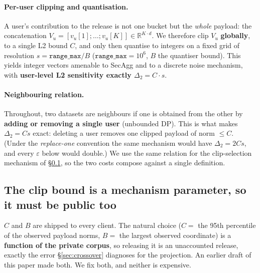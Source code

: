 \documentclass[pdflatex,sn-mathphys-num,iicol]{sn-jnl}
\theoremstyle{thmstyleone}%
\theoremstyle{thmstyletwo}%
\theoremstyle{thmstylethree}%
\newcommand{\eps}{\varepsilon}
\newcommand{\R}{\mathbb{R}}
\newcommand{\secref}[1]{\S\ref{#1}}
\begin{document}
\paragraph{Per-user clipping and quantisation.} A user's contribution to the
release is not one bucket but the \emph{whole} payload: the concatenation
$V_u = [v_u[1]; \dots; v_u[K]] \in \R^{K \cdot d}$. We therefore clip $V_u$
\textbf{globally}, to a single L2 bound $C$, and only then quantise to integers on
a fixed grid of resolution $s = \texttt{range\_max} / B$
($\texttt{range\_max} = 10^{6}$, $B$ the quantiser bound). This yields integer
vectors amenable to SecAgg and to a discrete noise mechanism, with
\textbf{user-level L2 sensitivity exactly $\Delta_2 = C \cdot s$}.

\paragraph{Neighbouring relation.} Throughout, two datasets are neighbours if one
is obtained from the other by \textbf{adding or removing a single user}
(unbounded DP). This is what makes $\Delta_2 = C s$ exact: deleting a user removes
one clipped payload of norm $\leq C$. (Under the \emph{replace-one} convention the
same mechanism would have $\Delta_2 = 2 C s$, and every $\eps$ below would double.)
We use the same relation for the clip-selection mechanism of \secref{sec:clip}, so
the two costs compose against a single definition.

\subsection{The clip bound is a mechanism parameter, so it must be public
too}\label{sec:clip}

$C$ and $B$ are shipped to every client. The natural choice ($C =$ the 95th
percentile of the observed payload norms, $B =$ the largest observed coordinate)
is a \textbf{function of the private corpus}, so releasing it is an unaccounted
release, exactly the error \secref{sec:crossover} diagnoses for the projection. An
earlier draft of this paper made both. We fix both, and neither is expensive.
\end{document}
